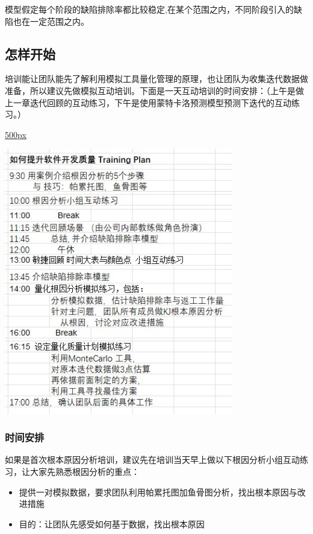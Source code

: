 模型假定每个阶段的缺陷排除率都比较稳定,在某个范围之内，不同阶段引入的缺陷也在一定范围之内。

\hypertarget{ux600eux6837ux5f00ux59cb}{%
\subsection{怎样开始}\label{ux600eux6837ux5f00ux59cb}}

培训能让团队能先了解利用模拟工具量化管理的原理，也让团队为收集迭代数据做准备，所以建议先做模拟互动培训。下面是一天互动培训的时间安排：（上午是做上一章迭代回顾的互动练习，下午是使用蒙特卡洛预测模型预测下迭代的互动练习。）

\href{文件:712trainingAgendaScreenshot_2022-07-12_125030.jpg}{500px}

\includegraphics[width=10cm]{712trainingAgendaScreenshot_2022-07-12_125030.jpg}

\hypertarget{ux65f6ux95f4ux5b89ux6392}{%
\subsubsection{时间安排}\label{ux65f6ux95f4ux5b89ux6392}}

如果是首次根本原因分析培训，建议先在培训当天早上做以下根因分析小组互动练习，让大家先熟悉根因分析的重点：

\begin{itemize}
\tightlist
\item
  提供一对模拟数据，要求团队利用帕累托图加鱼骨图分析，找出根本原因与改进措施
\item
  目的：让团队先感受如何基于数据，找出根本原因
\end{itemize}

